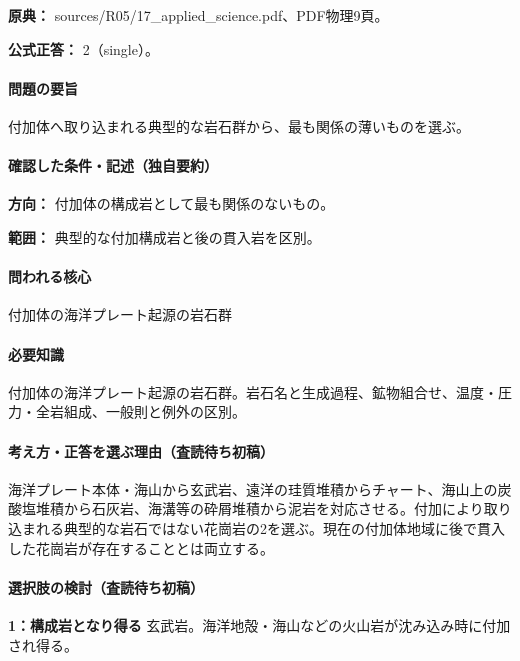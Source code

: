 \noindent\textbf{原典：} sources/R05/17\_applied\_science.pdf、PDF物理9頁。

\textbf{公式正答：} 2（single）。

\paragraph{問題の要旨} 付加体へ取り込まれる典型的な岩石群から、最も関係の薄いものを選ぶ。

\paragraph{確認した条件・記述（独自要約）}\mbox{}\par

\noindent\textbf{方向：} 付加体の構成岩として最も関係のないもの。\par

\noindent\textbf{範囲：} 典型的な付加構成岩と後の貫入岩を区別。\par

\paragraph{問われる核心} 付加体の海洋プレート起源の岩石群

\paragraph{必要知識} 付加体の海洋プレート起源の岩石群。岩石名と生成過程、鉱物組合せ、温度・圧力・全岩組成、一般則と例外の区別。

\paragraph{考え方・正答を選ぶ理由（査読待ち初稿）} 海洋プレート本体・海山から玄武岩、遠洋の珪質堆積からチャート、海山上の炭酸塩堆積から石灰岩、海溝等の砕屑堆積から泥岩を対応させる。付加により取り込まれる典型的な岩石ではない花崗岩の2を選ぶ。現在の付加体地域に後で貫入した花崗岩が存在することとは両立する。

\paragraph{選択肢の検討（査読待ち初稿）}\mbox{}\par

\noindent\textbf{1：構成岩となり得る} 玄武岩。海洋地殻・海山などの火山岩が沈み込み時に付加され得る。\par

